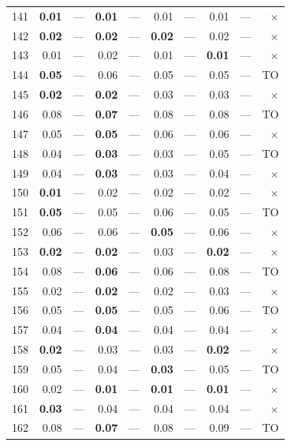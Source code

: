 \begin{longtable}{lr@{\hskip 4pt}l@{\hskip 12pt}r@{\hskip 4pt}l@{\hskip 12pt}r@{\hskip 4pt}l@{\hskip 12pt}r@{\hskip 4pt}l@{\hskip 12pt}r}
141 & \textbf{0.01} & --- & \textbf{0.01} & --- & 0.01 & --- & 0.01 & --- & $\times$ \\
142 & \textbf{0.02} & --- & \textbf{0.02} & --- & \textbf{0.02} & --- & 0.02 & --- & $\times$ \\
143 & 0.01 & --- & 0.02 & --- & 0.01 & --- & \textbf{0.01} & --- & $\times$ \\
144 & \textbf{0.05} & --- & 0.06 & --- & 0.05 & --- & 0.05 & --- & TO \\
145 & \textbf{0.02} & --- & \textbf{0.02} & --- & 0.03 & --- & 0.03 & --- & $\times$ \\
146 & 0.08 & --- & \textbf{0.07} & --- & 0.08 & --- & 0.08 & --- & TO \\
147 & 0.05 & --- & \textbf{0.05} & --- & 0.06 & --- & 0.06 & --- & $\times$ \\
148 & 0.04 & --- & \textbf{0.03} & --- & 0.03 & --- & 0.05 & --- & TO \\
149 & 0.04 & --- & \textbf{0.03} & --- & 0.03 & --- & 0.04 & --- & $\times$ \\
150 & \textbf{0.01} & --- & 0.02 & --- & 0.02 & --- & 0.02 & --- & $\times$ \\
151 & \textbf{0.05} & --- & 0.05 & --- & 0.06 & --- & 0.05 & --- & TO \\
152 & 0.06 & --- & 0.06 & --- & \textbf{0.05} & --- & 0.06 & --- & $\times$ \\
153 & \textbf{0.02} & --- & \textbf{0.02} & --- & 0.03 & --- & \textbf{0.02} & --- & $\times$ \\
154 & 0.08 & --- & \textbf{0.06} & --- & 0.06 & --- & 0.08 & --- & TO \\
155 & 0.02 & --- & \textbf{0.02} & --- & 0.02 & --- & 0.03 & --- & $\times$ \\
156 & 0.05 & --- & \textbf{0.05} & --- & 0.05 & --- & 0.06 & --- & TO \\
157 & 0.04 & --- & \textbf{0.04} & --- & 0.04 & --- & 0.04 & --- & $\times$ \\
158 & \textbf{0.02} & --- & 0.03 & --- & 0.03 & --- & \textbf{0.02} & --- & $\times$ \\
159 & 0.05 & --- & 0.04 & --- & \textbf{0.03} & --- & 0.05 & --- & TO \\
160 & 0.02 & --- & \textbf{0.01} & --- & \textbf{0.01} & --- & \textbf{0.01} & --- & $\times$ \\
161 & \textbf{0.03} & --- & 0.04 & --- & 0.04 & --- & 0.04 & --- & $\times$ \\
162 & 0.08 & --- & \textbf{0.07} & --- & 0.08 & --- & 0.09 & --- & TO \\

\end{longtable}

